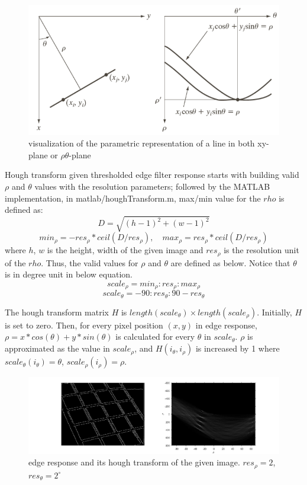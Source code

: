 \documentclass[extendedabs]{bmvc2k}
\begin{document}
\begin{figure}[h]
    \centering
    \includegraphics[width=\linewidth]{hw4_2_1}
    \caption{visualization of the parametric representation of a line in both xy-plane or $\rho\theta$-plane}
    \label{fig:3}
\end{figure}

Hough transform given thresholded edge filter response starts with building valid $\rho$ and $\theta$ values with
the resolution parameters; followed by the MATLAB implementation, in matlab/houghTransform.m, max/min value for 
the $rho$ is defined as:
\[D = \sqrt{(h-1)^2 + (w-1)^2}\]
\[min_{\rho} = -res_{\rho} * ceil(D / res_{\rho}) , \quad max_{\rho} = res_{\rho} * ceil(D / res_{\rho}) \]
where $h$, $w$ is the height, width of the given image and $res_{\rho}$ is the resolution unit of the $rho$.
Thus, the valid values for $\rho$ and $\theta$ are defined as below. Notice that $\theta$ is in degree unit in below equation.
\[scale_{\rho} = min_{\rho}:res_{\rho}:max_{\rho}\]
\[scale_{\theta} = -90:res_{\theta}:90-res_{\theta}\]

The hough transform matrix $H$ is $length(scale_{\theta}) \times length(scale_{\rho})$. Initially,
$H$ is set to zero. Then, for every pixel position $(x,y)$ in edge response, $\rho = x * cos(\theta) + y * sin(\theta)$ is calculated
for every $\theta$ in $scale_{\theta}$. $\rho$ is approximated as the value in $scale_{\rho}$, and $H(i_{\theta}, i_{\rho})$ is 
increased by 1 where $scale_{\theta}(i_{\theta}) = \theta$, $scale_{\rho}(i_{\rho}) = \rho$. 

\begin{figure}[h]
    \centering
    \includegraphics[width=\linewidth]{hw4_2_2}
    \caption{edge response and its hough transform of the given image. $res_{\rho} = 2$, $res_{\theta} = 2^{\circ}$}
    \label{fig:4}
\end{figure}
\end{document}
